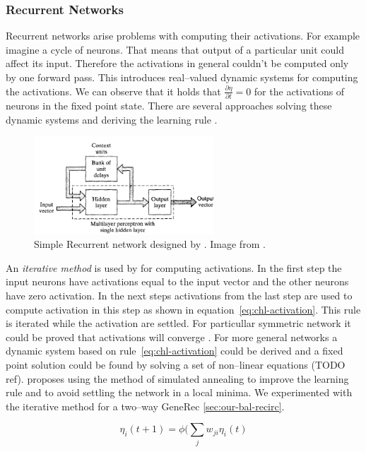 \subsubsection{Recurrent Networks}
\label{sec:theory-recurrent} 

Recurrent networks arise problems with computing their activations. For example imagine a cycle of neurons. That means that output of a particular unit could affect its input. Therefore the activations in general couldn't be computed only by one forward pass. This introduces real--valued dynamic systems for computing the activations. We can observe that it holds that $\frac{\partial\eta}{\partial t} = 0$ for the activations of neurons in the fixed point state. There are several approaches solving these dynamic systems and deriving the learning rule \cite{pineda1987generalization, pearlmutter1989learning, williams1989learning, elman1990finding, haykin1994neural}. 

\begin{figure}[H]
  \centering
  \includegraphics[width=0.6\textwidth]{img/theory-recurrent.png}    
  \caption{Simple Recurrent network designed by \citet{elman1990finding}. Image from \citep{haykin1994neural}.} 
  \label{fig:theory-recurrent}
\end{figure}

An \emph{iterative method} is used by \citet{movellan1990contrastive} for computing activations. In the first step the input neurons have activations equal to the input vector and the other neurons have zero activation. In the next steps activations from the last step are used to compute activation in this step as shown in equation~\ref{eq:chl-activation}. This rule is iterated while the activation are settled. For particullar symmetric network it could be proved that activations will converge \citep{o1996bio}. For more general networks a dynamic system based on rule~\ref{eq:chl-activation} could be derived and a fixed point solution could be found by solving a set of non--linear equations (TODO ref). \citet{movellan1990contrastive} proposes using the method of simulated annealing \citep{kirkpatrick1983optimization,vcerny1985thermodynamical} to improve the learning rule and to avoid settling the network in a local minima. We experimented with the iterative method for a two--way GeneRec \ref{sec:our-bal-recirc}. 

\begin{equation}
\label{eq:theory-recurrent-activation} 
\eta_i(t+1) = \phi(\sum_j w_{ji}\eta_i(t)
\end{equation}
